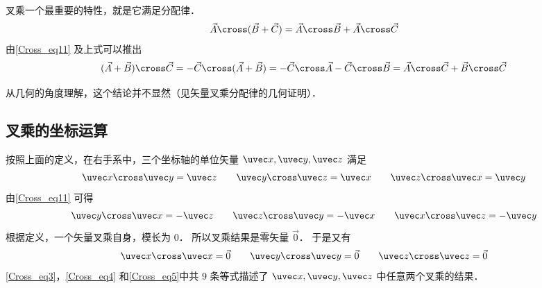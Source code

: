 叉乘一个最重要的特性，就是它满足分配律．
\begin{equation}\label{Cross_eq6}
\vec A \cross (\vec B +\vec C) = \vec A \cross \vec B + \vec A \cross \vec C
\end{equation}
由\autoref{Cross_eq11} 及上式可以推出
\begin{equation}\label{Cross_eq7}
(\vec A + \vec B) \cross \vec C =  - \vec C \cross (\vec A + \vec B) =  - \vec C \cross \vec A - \vec C \cross \vec B = \vec A \cross \vec C + \vec B \cross \vec C
\end{equation}

从几何的角度理解，这个结论并不显然（见矢量叉乘分配律的几何证明）．

\subsection{叉乘的坐标运算}

按照上面的定义，在右手系中，三个坐标轴的单位矢量 $\uvec x, \uvec y, \uvec z$ 满足
\begin{equation}\label{Cross_eq3}
\uvec x \cross \uvec y = \uvec z
\qquad
\uvec y \cross \uvec z = \uvec x
\qquad
\uvec z \cross \uvec x = \uvec y
\end{equation}
由\autoref{Cross_eq11} 可得
\begin{equation}\label{Cross_eq4}
\uvec y \cross \uvec x =  - \uvec z
\qquad
\uvec z \cross \uvec y =  - \uvec x
\qquad
\uvec x \cross \uvec z =  - \uvec y
\end{equation}
根据定义，一个矢量叉乘自身，模长为 $0$． 所以叉乘结果是零矢量 $\vec 0$． 于是又有
\begin{equation}\label{Cross_eq5}
\uvec x \cross \uvec x = \vec 0
\qquad
\uvec y \cross \uvec y = \vec 0
\qquad
\uvec z \cross \uvec z = \vec 0
\end{equation}
\autoref{Cross_eq3}，\autoref{Cross_eq4} 和\autoref{Cross_eq5}中共 9 条等式描述了 $\uvec x, \uvec y, \uvec z$ 中任意两个叉乘的结果．



